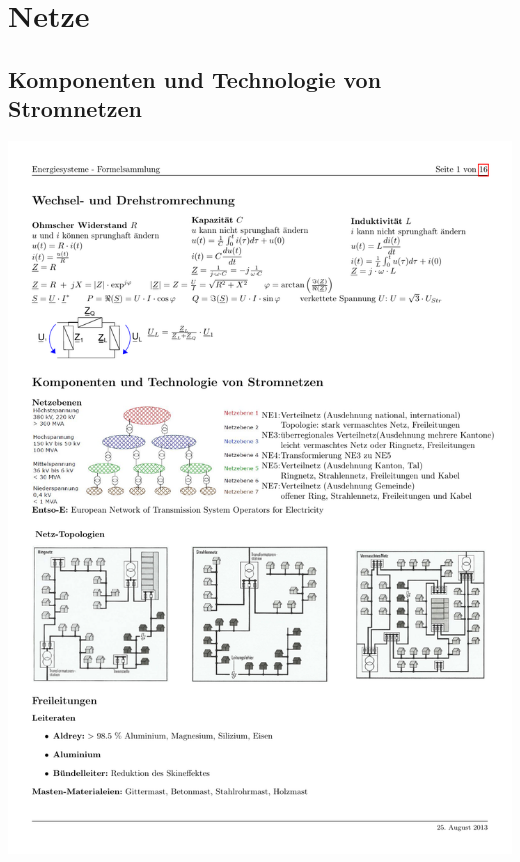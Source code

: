 \section{Netze}
	\subsection{Komponenten und Technologie von Stromnetzen}
		\includegraphics[width=\textwidth]{./images/Netztopologie.pdf}
		
